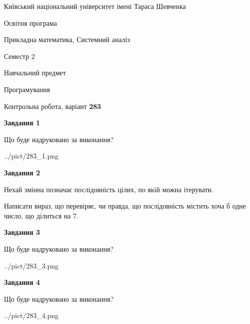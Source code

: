 \documentclass[12pt, ukrainian]{article}
\begin{document}
{{\begin {small}\par
{ \center  Київський національний університет імені Тараса Шевченка \par}
{\parbox {5 cm}{Освітня програма \hfill}{\parbox {8 cm}{Прикладна математика, Системний аналіз \hfill}}\parbox {5 cm}{\hfill Семестр 2}}\par
{\parbox {5 cm} {Навчальний предмет \hfill}\parbox {7 cm}{Програмування \hfill}\parbox {6cm}{\hfill}\par}\vspace{-7pt} \end{small}}{\center Контрольна робота, варіант  \No \textbf
{ 283 }\par}}
{
\begin {large}
{\begin {center}\textbf{Завдання 1}\end {center}}\par
Що буде надруковано за виконання?\par\par
\begin{center}
	{../pict/283_1.png}
\end{center}
\newpage

{\begin {center}\textbf{Завдання 2}\end {center}}\par
Нехай змінна  позначає послідовність цілих, по якій можна ітерувати.

Написати вираз, що перевіряє, чи правда, що послідовність  містить хоча б одне число, що ділиться на 7.\par
\newpage

{\begin {center}\textbf{Завдання 3}\end {center}}\par
Що буде надруковано за виконання?\par
\begin{center}
	{../pict/283_3.png}
\end{center}
\newpage

{\begin {center}\textbf{Завдання 4}\end {center}}\par
Що буде надруковано за виконання?\par
\begin{center}
	{../pict/283_4.png}
\end{center}
\newpage


\end{large}}
\end{document}
